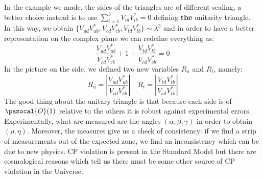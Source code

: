 \documentclass[../main.tex]{subfiles}
\begin{document}
In the example we made, the sides of the triangles are of different scaling, a better choice instead is to use $\sum_{i=1}^3V_{id}V_{ib}^*=0$ defining \textbf{the} unitarity triangle.\\
In this way, we obtain $\{V_{ud}V_{ub}^*,V_{cd}V_{cb}^*,V_{td}V_{tb}^*\}\sim\lambda^3$ and in order to have a better representation on the complex plane we can redefine everything as:
\[
\frac{V_{ud}V_{ub}^*}{V_{cd}V_{cb}^*}+1+\frac{V_{td}V_{tb}^*}{V_{cd}V_{cb}^*}=0
\]
In the picture on the side, we defined two new variables $R_u$ and $R_t$, namely:
\[
R_u=\left|\frac{V_{ud}V_{ub}^*}{V_{cd}V_{cb}^*}\right| \quad R_t=\left|\frac{V_{td}V_{tb}^*}{V_{cd}V_{cb}^*}\right|
\]
The good thing about the unitary triangle is that because each side is of $\pazocal{O}(1)$ relative to the others it is robust against experimental errors.\\
Experimentally, what are measured are the angles $(\alpha,\beta,\gamma)$ in order to obtain $(\rho,\eta)$. Moreover, the measures give us a check of consistency: if we find a strip of measurements out of the expected zone, we find an inconsistency which can be due to new physics. CP violation is present in the Standard Model but there are cosmological reasons which tell us there must be some other source of CP violation in the Universe.
\end{document}
